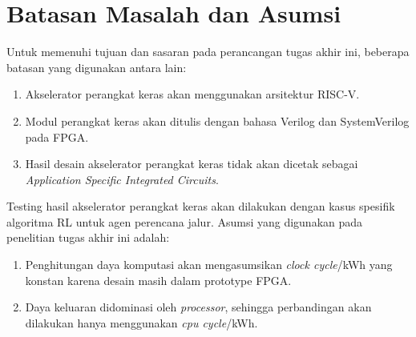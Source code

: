 \section{Batasan Masalah dan Asumsi}
\label{sec:batasan-masalah}

Untuk memenuhi tujuan dan sasaran pada perancangan tugas akhir ini, beberapa batasan yang digunakan antara lain:

\begin{enumerate}
	\item Akselerator perangkat keras akan menggunakan arsitektur RISC-V.
	\item Modul perangkat keras akan ditulis dengan bahasa Verilog dan SystemVerilog pada \ac{FPGA}.
	\item Hasil desain akselerator perangkat keras tidak akan dicetak sebagai \textit{Application Specific Integrated Circuits}.
\end{enumerate}

Testing hasil akselerator perangkat keras akan dilakukan dengan kasus spesifik algoritma \ac{RL} untuk agen perencana jalur. Asumsi yang digunakan pada penelitian tugas akhir ini adalah:

\begin{enumerate}
	\item Penghitungan daya komputasi akan mengasumsikan \textit{clock cycle}/kWh yang konstan karena desain masih dalam prototype \ac{FPGA}.
	\item Daya keluaran didominasi oleh \textit{processor}, sehingga perbandingan akan dilakukan hanya menggunakan \textit{cpu cycle}/kWh.
\end{enumerate}
